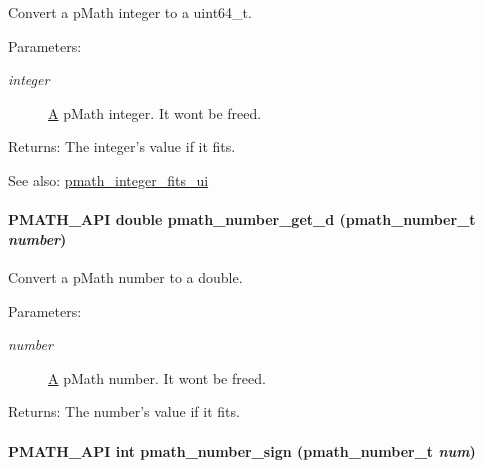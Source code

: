 Convert a pMath integer to a uint64\_\-t. 

\begin{Desc}
\item[Parameters:]
\begin{description}
\item[{\em integer}]\hyperlink{class_a}{A} pMath integer. It wont be freed. \end{description}
\end{Desc}
\begin{Desc}
\item[Returns:]The integer's value if it fits.\end{Desc}
\begin{Desc}
\item[See also:]\hyperlink{group__numbers_gb12e5e34b7918cb6beee23c57cdd0d36}{pmath\_\-integer\_\-fits\_\-ui} \end{Desc}
\hypertarget{group__numbers_g62617cbeeedaff88caaafec1dc84f329}{
\paragraph[{pmath\_\-number\_\-get\_\-d}]{\setlength{\rightskip}{0pt plus 5cm}PMATH\_\-API double pmath\_\-number\_\-get\_\-d ({\bf pmath\_\-number\_\-t} {\em number})}\hfill}
\label{group__numbers_g62617cbeeedaff88caaafec1dc84f329}


Convert a pMath number to a double. 

\begin{Desc}
\item[Parameters:]
\begin{description}
\item[{\em number}]\hyperlink{class_a}{A} pMath number. It wont be freed. \end{description}
\end{Desc}
\begin{Desc}
\item[Returns:]The number's value if it fits. \end{Desc}
\hypertarget{group__numbers_g7a736f04d207d140b3b052438cc371d0}{
\paragraph[{pmath\_\-number\_\-sign}]{\setlength{\rightskip}{0pt plus 5cm}PMATH\_\-API int pmath\_\-number\_\-sign ({\bf pmath\_\-number\_\-t} {\em num})}\hfill}
\label{group__numbers_g7a736f04d207d140b3b052438cc371d0}


